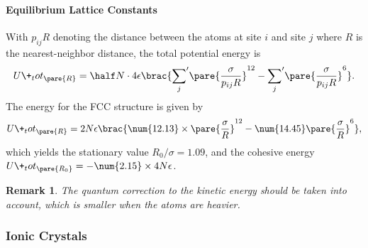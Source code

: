 \documentclass[hidelinks]{article}
\newtheorem{remark}{Remark}
\begin{document}
\paragraph{Equilibrium Lattice Constants} %
\label{par:equilibrium_lattice_constants}

With $p_{ij} R$ denoting the distance between the atoms at site $i$ and site $j$ where $R$ is the nearest-neighbor distance, the total potential energy is
\[ U\+_tot_\pare{R} = \half N\cdot {4\epsilon}\brac{{\sum_j}' \pare{\frac{\sigma}{p_{ij}R}}^{12} - {\sum_j}' \pare{\frac{\sigma}{p_{ij}R}}^6}. \]
The energy for the FCC structure is given by
\[ U\+_tot_\pare{R} = 2N\epsilon \brac{\num{12.13}\times \pare{\frac{\sigma}{R}}^{12} - \num{14.45}\pare{\frac{\sigma}{R}}^6}, \]
which yields the stationary value $R_0/\sigma = 1.09$, and the cohesive energy $U\+_tot_\pare{R_0} = -\num{2.15}\times 4N\epsilon$.
\begin{remark}
    The quantum correction to the kinetic energy should be taken into account, which is smaller when the atoms are heavier.
\end{remark}



\subsubsection{Ionic Crystals} %
\label{ssub:ionic_crystals}
\end{document}
